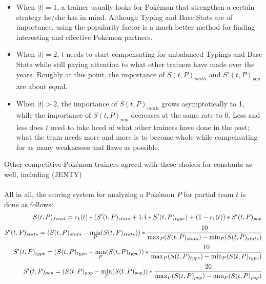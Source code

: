 \documentclass{article}
\begin{document}
\begin{itemize}
	\item When $|t|=1$, a trainer usually looks for Pok\'emon that strengthen a certain strategy he/she has in mind. Although Typing and Base Stats are of importance, using the popularity factor is a much better method for finding interesting and effective Pok\'emon partners.
	\item When $|t|=2$, $t$ needs to start compensating for unbalanced Typings and Base Stats while still paying attention to what other trainers have made over the years. Roughly at this point, the importance of $S(t,P)_{math}$ and $S'(t,P)_{pop}$ are about equal.
	\item When $|t|>2$, the importance of $S(t,P)_{math}$ grows asymptotically to 1, while the importance of $S(t,P)_{pop}$ decreases at the same rate to 0. Less and less does $t$ need to take heed of what other trainers have done in the past; what the team needs more and more is to become whole while compensating for as many weaknesses and flaws as possible.
\end{itemize}
Other competitive Pok\'emon trainers agreed with these choices for constants as well, including (JENTY)\\\\
All in all, the scoring system for analyzing a Pok\'emon $P$ for partial team $t$ is done as follows:
\begin{eqnarray*}
	S(t,P)_{final}=c_1(t)*(S'(t,P)_{stats}+1.4*S'(t,P)_{type})+(1-c_1(t))*S'(t,P)_{pop}\\
	S'(t,P)_{stats}=(S(t,P)_{stats}-\min_P(S(t,P)_{stats}))*\cfrac{10}{\max_P(S(t,P)_{stats})-\min_P(S(t,P)_{stats})}\\
	S'(t,P)_{type}=(S(t,P)_{type}-\min_P(S(t,P)_{type}))*\cfrac{10}{\max_P(S(t,P)_{type})-\min_P(S(t,P)_{type})}\\
	S'(t,P)_{pop}=(S(t,P)_{pop}-\min_P(S(t,P)_{pop}))*\cfrac{20}{\max_P(S(t,P)_{pop})-\min_P(S(t,P)_{pop})}
\end{eqnarray*}
\end{document}
